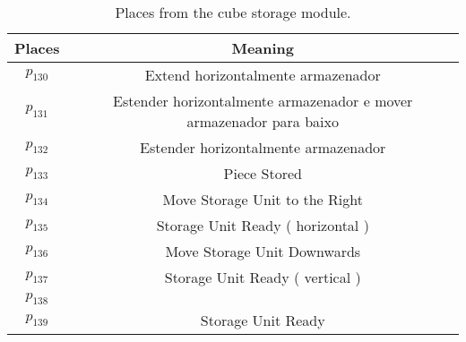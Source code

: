 \begin{table}[htbp]
\caption{Places from the cube storage module.}
\centering
\begin{tabular}{c|c}
Places & Meaning\\
\hline
\hyperlink{partialNet:p130}{\hypertarget{partialTable:p130}{$p_{130}$}} & Extend horizontalmente armazenador\\
\hyperlink{partialNet:p131}{\hypertarget{partialTable:p131}{$p_{131}$}} & Estender horizontalmente armazenador e mover armazenador para baixo\\
\hyperlink{partialNet:p132}{\hypertarget{partialTable:p132}{$p_{132}$}} & Estender horizontalmente armazenador\\
\hyperlink{partialNet:p133}{\hypertarget{partialTable:p133}{$p_{133}$}} & Piece Stored\\
\hyperlink{partialNet:p134}{\hypertarget{partialTable:p134}{$p_{134}$}} & Move Storage Unit to the Right\\
\hyperlink{partialNet:p135}{\hypertarget{partialTable:p135}{$p_{135}$}} & Storage Unit Ready ( horizontal )\\
\hyperlink{partialNet:p136}{\hypertarget{partialTable:p136}{$p_{136}$}} & Move Storage Unit Downwards\\
\hyperlink{partialNet:p137}{\hypertarget{partialTable:p137}{$p_{137}$}} & Storage Unit Ready ( vertical )\\
\hyperlink{partialNet:p138}{\hypertarget{partialTable:p138}{$p_{138}$}} & \\
\hyperlink{partialNet:p139}{\hypertarget{partialTable:p139}{$p_{139}$}} & Storage Unit Ready\\
\end{tabular}
\end{table}

